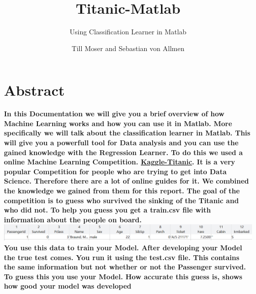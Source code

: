 \documentclass[
   10.5pt,
   invert-title=true,
   titlepage=false,
   titleimage-ratio=13,
   class=article
]{bfhpub}				%
\begin{document}
\setlength{\parskip}{0pt}
\setlength{\parindent}{0pt}
  \title{Titanic-Matlab}
  \subtitle{Using Classification Learner in Matlab}
  \author{Till Moser and Sebastian von Allmen}
  \subject{BZG1308ab}
  
  \maketitle

\section*{Abstract}
\textbf{In this Documentation we will give you a brief overview of how Machine Learning works and how you can use it in Matlab. More specifically we will talk about the classification learner in Matlab. This will give you a powerfull tool for Data analysis and you can use the gained knowledge with the Regression Learner.\newline
To do this we used a online Machine Learning Competition. \href{https://www.kaggle.com/c/titanic}{Kaggle-Titanic}. It is a very popular Competition for people who are trying to get into Data Science. Therefore there are a lot of online guides for it. We combined the knowledge we gained from them for this report. The goal of the competition is to guess who survived the sinking of the Titanic and who did not. To help you guess you get a train.csv file with information about the people on board. 
\includegraphics[width=155mm\\]{data}
\newline
You use this data to train your Model. After developing your Model the true test comes. You run it using the test.csv file. This contains the same information but not whether or not the Passenger survived. To guess this you use your Model. How accurate this guess is, shows how good your model was developed}
\end{document}
